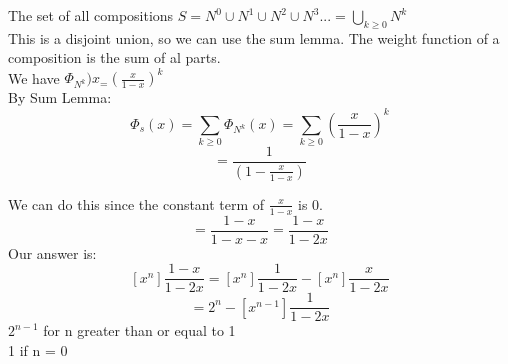 \documentclass[12pt]{article}
\begin{document}
	The set of all compositions $S = N^0 \cup N^1 \cup N^2 \cup N^3 ... = \bigcup_{k \geq 0}N^k$\\
	This is a disjoint union, so we can use the sum lemma. The weight function of a composition is the sum of al parts.\\
	
	We have $\Phi_{N^k})x_ = (\frac{x}{1-x})^k$\\
	By Sum Lemma:\\
	$$\Phi_s(x) = \sum_{k \geq 0}\Phi_{N^k}(x) = \sum_{k \geq 0}(\frac{x}{1-x})^k$$
	$$= \frac{1}{(1 - \frac{x}{1-x})}$$
	
	We can do this since the constant term of $\frac{x}{1-x}$ is 0.\\
	
	$$= \frac{1-x}{1-x-x} = \frac{1-x}{1-2x}$$
	Our answer is:
	$$[x^n]\frac{1-x}{1-2x} = [x^n]\frac{1}{1-2x} - [x^n]\frac{x}{1-2x}$$
	$$ = 2^n - [x^{n-1}]\frac{1}{1-2x}$$
	$2^{n-1}$ for n greater than or equal to 1\\
	1 if n = 0\\
	
	
	
\end{document}
